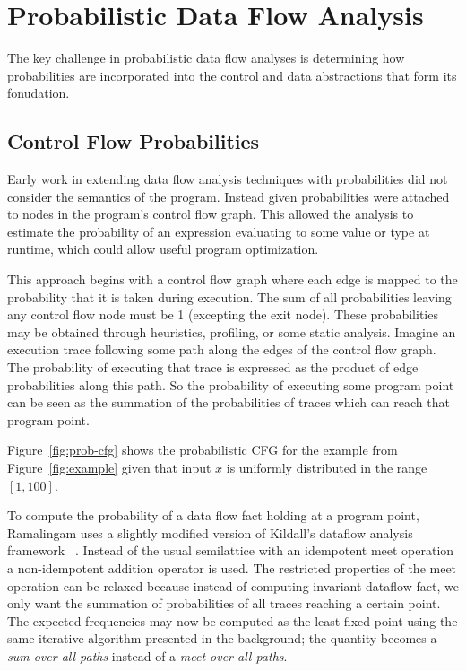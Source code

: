 \section{Probabilistic Data Flow Analysis}
\label{sec:pdfa}

The key challenge in probabilistic data flow analyses is
determining how probabilities are incorporated into the control
and data abstractions that form its fonudation.

\subsection{Control Flow Probabilities}
Early work in extending data flow analysis 
techniques with probabilities did not consider
the semantics of the program. 
Instead given probabilities 
were attached to nodes in the program's control flow graph.  
This allowed the analysis to estimate
the probability of an expression evaluating 
to some value or type at runtime, which could 
allow useful program optimization.

This approach begins with a control flow graph where each edge is 
mapped to the probability that it is taken during execution.
The sum of all probabilities leaving any control flow node must be 1
(excepting the exit node).
These probabilities may be obtained through heuristics, profiling,
or some static analysis.
Imagine an execution trace following some path along the edges of
the control flow graph.
The probability of executing that trace is expressed as the product of 
edge probabilities along this path.
So the probability of executing some program point can be seen as the
summation of the probabilities of traces which can reach that program point.


Figure~\ref{fig:prob-cfg} shows the probabilistic CFG for the
example from Figure~\ref{fig:example} given that input $x$
is uniformly distributed in the range $[1,100]$.

To compute the probability of a data flow fact holding 
at a program point, Ramalingam uses a slightly
modified version of Kildall's dataflow analysis framework
~\cite{ramalingam1996data}.
Instead of the usual semilattice with an idempotent meet
operation a non-idempotent addition operator is used.
The restricted properties of the meet operation can be
relaxed because instead of computing invariant dataflow
fact, we only want the summation of probabilities of all
traces reaching a certain point.
The expected frequencies may now be computed as the least
fixed point using the same iterative algorithm presented
in the background; the quantity becomes a
{\sl sum-over-all-paths} instead of a {\sl meet-over-all-paths}.

